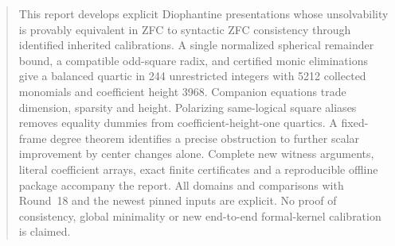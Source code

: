 \begin{abstract}
This report develops explicit Diophantine presentations whose unsolvability
is provably equivalent in ZFC to syntactic ZFC consistency through identified
inherited calibrations. A single normalized spherical remainder bound,
a compatible odd-square radix, and certified monic eliminations give a
balanced quartic in 244 unrestricted integers with 5212 collected monomials
and coefficient height 3968. Companion equations trade dimension, sparsity
and height. Polarizing same-logical square aliases removes equality dummies
from coefficient-height-one quartics. A fixed-frame degree theorem identifies
a precise obstruction to further scalar improvement by center changes alone.
Complete new witness arguments, literal coefficient arrays, exact finite
certificates and a reproducible offline package accompany the report.
All domains and comparisons with Round~18 and the newest pinned inputs are
explicit. No proof of consistency, global minimality or new end-to-end
formal-kernel calibration is claimed.
\end{abstract}
